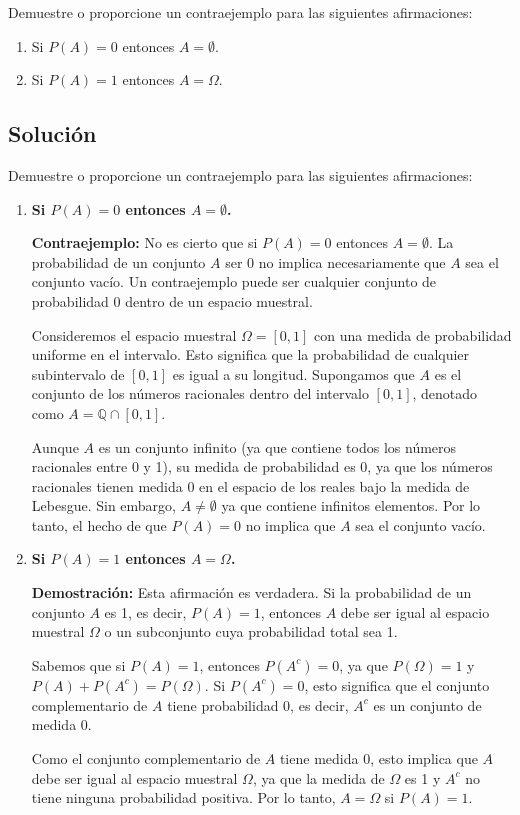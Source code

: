 \documentclass[titlepage]{article} %
\begin{document}
    \Large Demuestre o proporcione un contraejemplo para las siguientes afirmaciones:

\begin{enumerate}
    \item Si $P(A) = 0$ entonces $A = \emptyset$.
    \item Si $P(A) = 1$ entonces $A = \Omega$.
\end{enumerate}

\subsection*{\Large Solución}

\Large
Demuestre o proporcione un contraejemplo para las siguientes afirmaciones:

\begin{enumerate}
    \item \textbf{Si $P(A) = 0$ entonces $A = \emptyset$.}

    \textbf{Contraejemplo:}  
    No es cierto que si $P(A) = 0$ entonces $A = \emptyset$. La probabilidad de un conjunto $A$ ser 0 no implica necesariamente que $A$ sea el conjunto vacío. Un contraejemplo puede ser cualquier conjunto de probabilidad 0 dentro de un espacio muestral. 

    Consideremos el espacio muestral $\Omega = [0,1]$ con una medida de probabilidad uniforme en el intervalo. Esto significa que la probabilidad de cualquier subintervalo de $[0,1]$ es igual a su longitud. Supongamos que $A$ es el conjunto de los números racionales dentro del intervalo $[0,1]$, denotado como $A = \mathbb{Q} \cap [0,1]$.

    Aunque $A$ es un conjunto infinito (ya que contiene todos los números racionales entre 0 y 1), su medida de probabilidad es 0, ya que los números racionales tienen medida 0 en el espacio de los reales bajo la medida de Lebesgue. Sin embargo, $A \neq \emptyset$ ya que contiene infinitos elementos. Por lo tanto, el hecho de que $P(A) = 0$ no implica que $A$ sea el conjunto vacío.

    \item \textbf{Si $P(A) = 1$ entonces $A = \Omega$.}

    \textbf{Demostración:}  
    Esta afirmación es verdadera. Si la probabilidad de un conjunto $A$ es 1, es decir, $P(A) = 1$, entonces $A$ debe ser igual al espacio muestral $\Omega$ o un subconjunto cuya probabilidad total sea 1.

    Sabemos que si $P(A) = 1$, entonces $P(A^c) = 0$, ya que $P(\Omega) = 1$ y $P(A) + P(A^c) = P(\Omega)$. Si $P(A^c) = 0$, esto significa que el conjunto complementario de $A$ tiene probabilidad 0, es decir, $A^c$ es un conjunto de medida 0. 

    Como el conjunto complementario de $A$ tiene medida 0, esto implica que $A$ debe ser igual al espacio muestral $\Omega$, ya que la medida de $\Omega$ es 1 y $A^c$ no tiene ninguna probabilidad positiva. Por lo tanto, $A = \Omega$ si $P(A) = 1$.

\end{enumerate}
\end{document}
